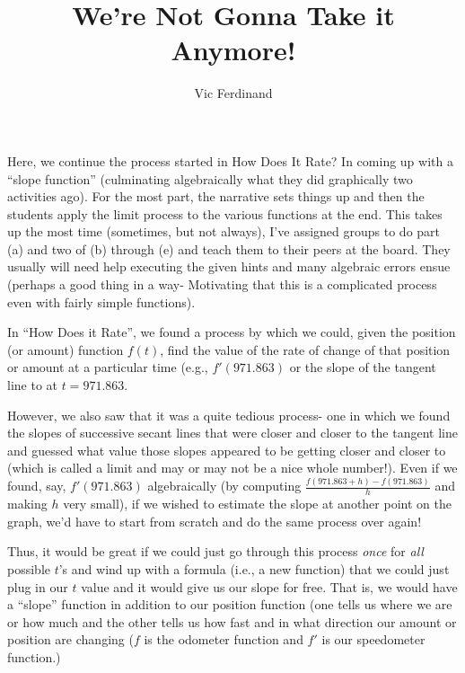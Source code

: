 \documentclass{ximera}
\author{Vic Ferdinand}
\title{We're Not Gonna Take it Anymore!}
\begin{document}
\begin{abstract} 
\end{abstract}
\maketitle

\begin{instructorIntro}
Here, we continue the process started in How Does It Rate?  In coming up with a ``slope function'' (culminating algebraically what they did graphically two activities ago).  For the most part, the narrative sets things up and then the students apply the limit process to the various functions at the end.  This takes up the most time (sometimes, but not always), I've assigned groups to do part (a) and two of (b) through (e) and teach them to their peers at the board.  They usually will need help executing the given hints and many algebraic errors ensue (perhaps a good thing in a way- Motivating that this is a complicated process even with fairly simple functions).
\end{instructorIntro}



In ``How Does it Rate'', we found a process by which we could, given the position (or amount) function  $f(t)$, find the value of the rate of change of that position or amount at a particular time (e.g., $f'(971.863)$  or the slope of the tangent line to at $t=971.863$.

However, we also saw that it was a quite tedious process- one in which we found the slopes of successive secant lines that were closer and closer to the tangent line and guessed what value those slopes appeared to be getting closer and closer to (which is called a limit and may or may not be a nice whole number!).  Even if we found, say, $f'(971.863)$ algebraically (by computing $\frac{f(971.863+h) - f(971.863)}{h}$  and making $h$ very small), if we wished to estimate the slope at another point on the graph, we'd have to start from scratch and do the same process over again!

Thus, it would be great if we could just go through this process {\em once} for {\em all} possible $t$'s and wind up with a formula (i.e., a new function) that we could just plug in our $t$ value and it would give us our slope for free.  That is, we would have a ``slope'' function in addition to our position function (one tells us where we are or how much and the other tells us how fast and in what direction our amount or position are changing ($f$ is the odometer function and $f'$ is our speedometer function.)
\end{document}
